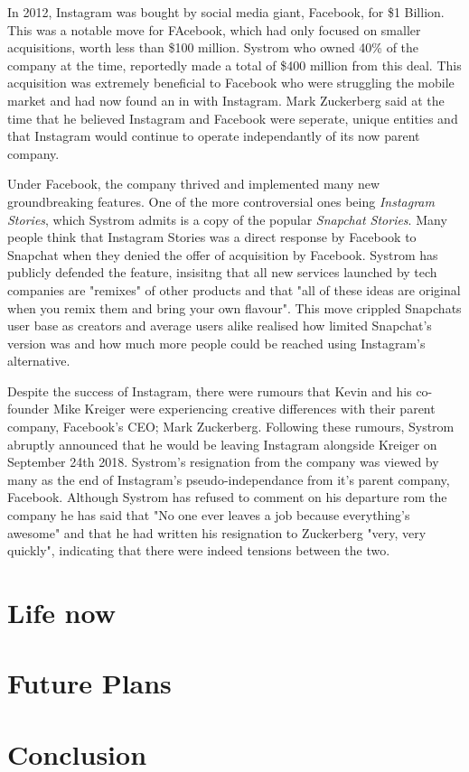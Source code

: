 \documentclass[12pt]{article}
\begin{document}
    In 2012, Instagram was bought by social media giant, Facebook, for \$1 Billion. This was a notable move for FAcebook, which had only focused on smaller acquisitions,
    worth less than \$100 million.
    Systrom who owned 40\% of the company at the time,
    reportedly made a total of \$400 million from this deal. This acquisition was extremely beneficial to Facebook who were 
    struggling the mobile market and had now found an in with Instagram. 
    Mark Zuckerberg said at the time that he believed Instagram and Facebook were seperate, unique entities 
    and that Instagram would continue to operate independantly of its now parent company.

    Under Facebook, the company thrived and implemented many new groundbreaking features. One of the more controversial ones being \textit{Instagram Stories}, which Systrom admits is a copy of the
    popular \textit{Snapchat Stories}. Many people think that Instagram Stories was a direct response by Facebook to Snapchat when they denied the offer of acquisition by Facebook.
    Systrom has publicly defended the feature, insisitng that all new services launched by tech companies are "remixes" of other products and that
    "all of these ideas are original when you remix them and bring your own flavour". This move crippled Snapchats user base as creators and average users alike realised how limited
    Snapchat's version was and how much more people could be reached using Instagram's alternative. 

    Despite the success of Instagram, there were rumours that 
    Kevin and his co-founder Mike Kreiger were experiencing 
    creative differences with their parent company, Facebook's CEO; Mark Zuckerberg. Following these rumours, Systrom abruptly
    announced that he would be leaving Instagram alongside Kreiger on September 24th 2018. Systrom's resignation from the company was viewed 
    by many as the end of Instagram's pseudo-independance from it's parent company, Facebook.
    Although Systrom has refused to comment on his departure rom the company he has said that "No one ever leaves a job because everything's awesome"
    and that he had written his resignation to Zuckerberg "very, very quickly", indicating that there were indeed tensions between the two.
    \section{Life now}
    
    \section{Future Plans}

    \section{Conclusion}
    \newpage
\end{document}
